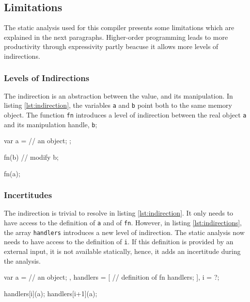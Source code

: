 \subsection{Limitations}

The static analysis used for this compiler presents some limitations which are explained in the next paragraphs.
Higher-order programming leads to more productivity through expressivity partly beacuse it allows more levels of indirections.

\subsubsection{Levels of Indirections}

The indirection is an abstraction between the value, and its manipulation.
In listing \ref{lst:indirection}, the variables \texttt{a} and \texttt{b} point both to the same memory object.
The function \texttt{fn} introduces a level of indirection between the real object \texttt{a} and its manipulation handle, \texttt{b};

\begin{code}[js,
  caption={One level of Indirection},
  label={lst:indirection}]
var a = {
      // an object;
    };

fn(b) {
  // modify b;
}

fn(a);
\end{code}

\subsubsection{Incertitudes}

The indirection is trivial to resolve in listing \ref{lst:indirection}.
It only needs to have access to the definition of \texttt{a} and of \texttt{fn}.
However, in listing \ref{lst:indirections}, the array \texttt{handlers} introduces a new level of indirection.
The static analysis now needs to have access to the definition of \texttt{i}.
If this definition is provided by an external input, it is not available statically, hence, it adds an incertitude during the analysis. 

\begin{code}[js,
  caption={Two levels of indirection},
  label={lst:indirections}]
var a = {
      // an object;
    },
    handlers = [
      // definition of fn handlers;
    ],
    i = ?;

handlers[i](a);
handlers[i+1](a);
\end{code}


